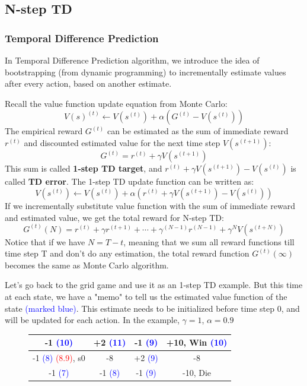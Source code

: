 \documentclass[11pt]{article}
\begin{document}
\subsection{N-step TD}
\subsubsection{Temporal Difference Prediction}
In Temporal Difference Prediction algorithm, we introduce the idea of bootstrapping (from dynamic programming) to incrementally estimate values after every action, based on another estimate.

Recall the value function update equation from Monte Carlo:
\[ V(s)^{(t)} \leftarrow V(s^{(t)}) + \alpha (G^{(t)} - V(s^{(t)})) \]
The empirical reward $G^{(t)}$ can be estimated as the sum of immediate reward $r^{(t)}$ and discounted estimated value for the next time step $V(s^{(t+1)})$:
\[ G^{(t)} = r^{(t)} + \gamma V(s^{(t+1)}) \]
This sum is called \textbf{1-step TD target}, and $r^{(t)} + \gamma V(s^{(t+1)}) - V(s^{(t)})$ is called \textbf{TD error}. The 1-step TD update function can be written as:
\[ V(s^{(t)}) \leftarrow V(s^{(t)}) + \alpha (r^{(t)} + \gamma V(s^{(t+1)}) - V(s^{(t)})) \]
If we incrementally substitute value function with the sum of immediate reward and estimated value, we get the total reward for N-step TD:
\[ G^{(t)}(N) = r^{(t)} + \gamma r^{(t+1)} + \cdots + \gamma ^{(N-1)} r^{(N-1)} +\gamma ^ N V(s^{(t + N)}) \]
Notice that if we have $N=T-t$, meaning that we sum all reward functions till time step T and don't do any estimation, the total reward function $G^{(t)}(\infty)$ becomes the same as Monte Carlo algorithm.

Let's go back to the grid game and use it as an 1-step TD example. But this time at each state, we have a "memo" to tell us the estimated value function of the state \textcolor{blue}{(marked blue)}. This estimate needs to be initialized before time step 0, and will be updated for each action. In the example, $\gamma=1$, $\alpha=0.9$
\begin{figure}[h]
\centering
\begin{tabular}{| c | c | c | c |}
\hline
-1 \textcolor{blue}{(10)} & +2 \textcolor{blue}{(11)} & -1 \textcolor{blue}{(9)} & +10, Win \textcolor{blue}{(10)} \\
\hline
-1 \textcolor{blue}{(8)} \textcolor{red}{(8.9)}, s0 & -8 & +2 \textcolor{blue}{(9)} & -8 \\
\hline
-1 \textcolor{blue}{(7)} & -1 \textcolor{blue}{(8)} & -1 \textcolor{blue}{(9)} & -10, Die \\
\hline
\end{tabular}
\end{figure}
\end{document}
